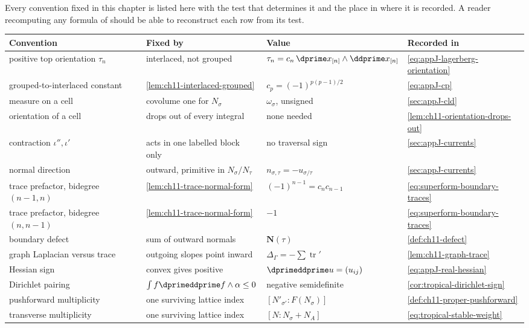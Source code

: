 Every convention fixed in this chapter is listed here with the test that
determines it and the place in  where it is
recorded.  A reader recomputing any formula of
 should be able to reconstruct
each row from its test.

\begin{center}
\small
\begin{tabular}{p{}|p{}|p{}|p{}}
\textbf{Convention}&\textbf{Fixed by}&\textbf{Value}&\textbf{Recorded in}\\
\hline
positive top orientation $\tau_n$
  &interlaced, not grouped
  &$\tau_n=c_n\,\dprime x_{[n]}\wedge\ddprime x_{[n]}$
  &\eqref{eq:appJ-lagerberg-orientation}\\
grouped-to-interlaced constant
  &\cref{lem:ch11-interlaced-grouped}
  &$c_p=(-1)^{p(p-1)/2}$
  &\eqref{eq:appJ-cp}\\
measure on a cell
  &covolume one for $N_\sigma$
  &$\omega_\sigma$, unsigned
  &\cref{sec:appJ-cld}\\
orientation of a cell
  &drops out of every integral
  &none needed
  &\cref{lem:ch11-orientation-drops-out}\\
contraction $\iota'',\iota'$
  &acts in one labelled block only
  &no traversal sign
  &\cref{sec:appJ-currents}\\
normal direction
  &outward, primitive in $N_\sigma/N_\tau$
  &$n_{\sigma,\tau}=-u_{\sigma/\tau}$
  &\cref{sec:appJ-currents}\\
trace prefactor, bidegree $(n-1,n)$
  &\cref{lem:ch11-trace-normal-form}
  &$(-1)^{n-1}=c_nc_{n-1}$
  &\eqref{eq:superform-boundary-traces}\\
trace prefactor, bidegree $(n,n-1)$
  &\cref{lem:ch11-trace-normal-form}
  &$-1$
  &\eqref{eq:superform-boundary-traces}\\
boundary defect
  &sum of outward normals
  &$\mathbf N(\tau)$
  &\cref{def:ch11-defect}\\
graph Laplacian versus trace
  &outgoing slopes point inward
  &$\Delta_\Gamma=-\sum\operatorname{tr}'$
  &\cref{lem:ch11-graph-trace}\\
Hessian sign
  &convex gives positive
  &$\dprimeddprime u=(u_{ij})$
  &\eqref{eq:appJ-real-hessian}\\
Dirichlet pairing
  &$\int f\dprimeddprime f\wedge\alpha\le0$
  &negative semidefinite
  &\cref{cor:tropical-dirichlet-sign}\\
pushforward multiplicity
  &one surviving lattice index
  &$[N'_{\sigma'}:F(N_\sigma)]$
  &\cref{def:ch11-proper-pushforward}\\
transverse multiplicity
  &one surviving lattice index
  &$[N:N_\sigma+N_A]$
  &\eqref{eq:tropical-stable-weight}
\end{tabular}
\end{center}

